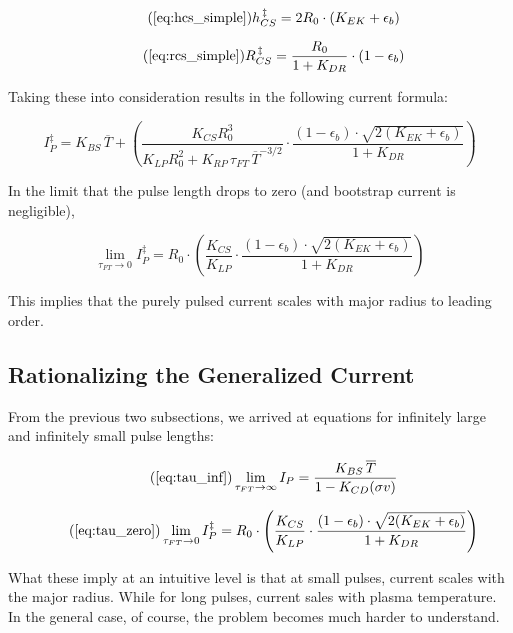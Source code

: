 \begin{equation}
	\tag{\ref{eq:hcs_simple}}
	h_{CS}^{\,\ddagger} = 2 R_0 \cdot \left( K_{EK} + \epsilon_b \right) 
\end{equation}

\begin{equation}
	\tag{\ref{eq:rcs_simple}}
	R_{CS}^{\,\ddagger} = \frac{ R_0 }{ 1 + K_{DR} } \cdot \left( 1 - \epsilon_b  \right)
\end{equation}

Taking these into consideration results in the following current formula:

\begin{equation}
	I_P^\ddagger = K_{BS} \, \overline T + \left( \frac{ K_{CS} R_0^3 }{ K_{LP} R_0^2 + K_{RP} \, \tau_{FT} \, \overline T ^ {-3/2} } \cdot \frac{ ( 1 - \epsilon_b ) \cdot \sqrt{ 2 ( K_{EK} + \epsilon_b ) } }{ 1 + K_{DR} } \right)
\end{equation}

In the limit that the pulse length drops to zero (and bootstrap current is negligible),

\begin{equation}
	\label{eq:tau_zero}
	\lim_{ \tau_{FT} \to 0 } I_P^\ddagger = R_0 \cdot \left( \frac{ K_{CS} }{ K_{LP} } \cdot \frac{ ( 1 - \epsilon_b ) \cdot \sqrt{ 2 ( K_{EK} + \epsilon_b ) } }{ 1 + K_{DR} } \right)
\end{equation}

This implies that the purely pulsed current scales with major radius to leading order.

\subsection{Rationalizing the Generalized Current}

From the previous two subsections, we arrived at equations for infinitely large and infinitely small pulse lengths:

\begin{equation}
	\tag{\ref{eq:tau_inf}}
	\lim_{\tau_{FT} \to \infty} I_P = \frac{ K_{BS} \, \overline T }{ 1 - K_{CD} ( \sigma v ) }
\end{equation}

\begin{equation}
	\tag{\ref{eq:tau_zero}}
	\lim_{ \tau_{FT} \to 0 } I_P^\ddagger = R_0 \cdot \left( \frac{ K_{CS} }{ K_{LP} } \cdot \frac{ ( 1 - \epsilon_b ) \cdot \sqrt{ 2 ( K_{EK} + \epsilon_b ) } }{ 1 + K_{DR} } \right)
\end{equation}

What these imply at an intuitive level is that at small pulses, current scales with the major radius. While for long pulses, current sales with plasma temperature. In the general case, of course, the problem becomes much harder to understand.

%
